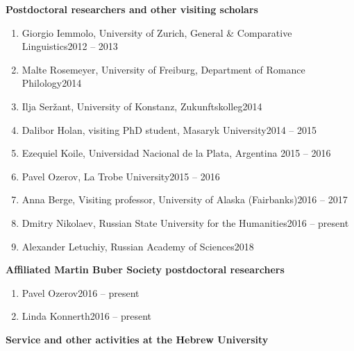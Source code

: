 \documentclass[letterpaper,11pt]{article}
\newcommand{\resheading}[1]{
\vspace*{6pt}
{\large \colorbox{mygrey}{\begin{minipage}{\textwidth}{\textbf{#1 \vphantom{p\^{E}}}}\end{minipage}}}
}
\begin{document}
\begin{flushleft}\textbf{Postdoctoral researchers and other visiting scholars}
\end{flushleft}
\begin{enumerate}
\item {Giorgio Iemmolo, University of Zurich, General \& Comparative Linguistics}\hfill{2012 -- 2013}\\ 
\item {Malte Rosemeyer, University of Freiburg, Department of Romance Philology}\hfill{2014}\\
\item {Ilja Ser\v{z}ant, University of Konstanz, Zukunftskolleg}\hfill{2014}\\
\item {Dalibor Holan, visiting PhD student, Masaryk University}\hfill{2014 -- 2015}\\
\item{Ezequiel Koile, Universidad Nacional de la Plata, Argentina }\hfill{2015 -- 2016}
\item {Pavel Ozerov, La Trobe University}\hfill{2015 -- 2016}
\item {Anna Berge, Visiting professor, University of Alaska (Fairbanks)}\hfill{2016 -- 2017}\\
\item {Dmitry Nikolaev, Russian State University for the Humanities}\hfill{2016 -- present}
\item {Alexander Letuchiy, Russian Academy of Sciences}\hfill{2018}
\end{enumerate}	

\begin{flushleft} \textbf{Affiliated Martin Buber Society postdoctoral researchers}
\end{flushleft}
\begin{enumerate}
    \item {Pavel Ozerov}\hfill{2016 -- present}
    \item {Linda Konnerth}\hfill{2016 -- present} 
\end{enumerate}

\resheading{Service and other activities at the Hebrew University} 
\end{document}
